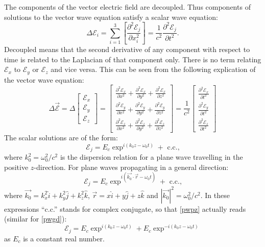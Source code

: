 The components of the vector electric field are decoupled.
Thus components of solutions to the vector wave equation
satisfy a scalar wave equation:
\begin{equation}
  \Delta \mathcal{E}_i =
  \sum_{i=1}^3\left[\frac{\partial^2\mathcal{E}_j}{\partial x_i^2}\right] =
  \frac{1}{c^2} \frac{\partial^2 \mathcal{E}_j}{\partial t^2}.
\end{equation}
Decoupled means that the second derivative of any component with respect to time is related to
the Laplacian of that component only. There is no term relating $\mathcal{E}_x$
to $\mathcal{E}_y$ or $\mathcal{E}_z$ and vice versa.
This can be seen from the following explication of the vector wave equation:
\begin{equation}
  \Delta \vec{\mathcal{E}} = \Delta \begin{bmatrix}
    \mathcal{E}_x\\
    \mathcal{E}_y\\
    \mathcal{E}_z
  \end{bmatrix} = \begin{bmatrix}
    \frac{\partial^2\mathcal{E}_x}{\partial x^2}+
    \frac{\partial^2\mathcal{E}_x}{\partial y^2}+
    \frac{\partial^2\mathcal{E}_x}{\partial z^2}\\
    \frac{\partial^2\mathcal{E}_y}{\partial x^2}+
    \frac{\partial^2\mathcal{E}_y}{\partial y^2}+
    \frac{\partial^2\mathcal{E}_y}{\partial z^2}\\
    \frac{\partial^2\mathcal{E}_z}{\partial x^2}+
    \frac{\partial^2\mathcal{E}_z}{\partial y^2}+
    \frac{\partial^2\mathcal{E}_z}{\partial z^2}
  \end{bmatrix} = \frac{1}{c^2} \begin{bmatrix}
    \frac{\partial^2\mathcal{E}_x}{\partial t^2}\\
    \frac{\partial^2\mathcal{E}_y}{\partial t^2}\\
    \frac{\partial^2\mathcal{E}_z}{\partial t^2}
  \end{bmatrix}
\end{equation}
The scalar solutions are of the form:
\begin{equation}
  \label{pwpz}\mathcal{E}_j=E_c\exp^{i(k_0z-\omega_0t)}+\text{ c.c.,}
\end{equation}
where $k_0^2=\omega_0^2/c^2$ is the dispersion relation for a plane wave travelling in the positive $z$-direction.
For plane waves propagating in a general direction:
\begin{equation}
  \label{pwgd}\mathcal{E}_j=E_c\exp^{i(\vec{k_0}\cdotp\vec{r}-\omega_0t)}+\text{ c.c.,}
\end{equation}
where $\vec{k_0}=k_x^2\hat{i}+k_y^2\hat{j}+k_z^2\hat{k}$, $\vec{r}=x\hat{i}+y\hat{j}+z\hat{k}$
and $|\vec{k_0}|^2=\omega_0^2/c^2$.
In these expressions ``c.c.'' stands for complex conjugate, so that \ref{pwpz} actually reads (similar for \ref{pwgd}):
\begin{equation}
  \mathcal{E}_j=E_c\exp^{i(k_0z-\omega_0t)}+E_c\exp^{-i(k_0z-\omega_0t)}
\end{equation}
as $E_c$ is a constant real number.

